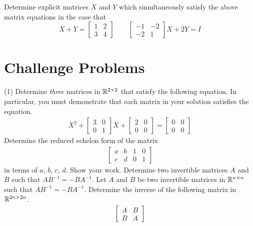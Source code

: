 \begin{tasks}[resume, style=enumerate]
\begin{enumerate}[label=(\alph*)]
    Determine explicit matrices $X$ and $Y$ which simultaneously
    satisfy the above matrix equations in the case that
    \begin{displaymath}
      X + Y = \begin{bmatrix} 1 & 2 \\ 3 & 4 \end{bmatrix}
      \qquad
      \begin{bmatrix} -1 & -2 \\ -2 & 1 \end{bmatrix} X + 2Y = I
    \end{displaymath}
  \end{enumerate}
\end{tasks}

\section{Challenge Problems}

\begin{tasks}[resume, style=enumerate](1)
\task
  Determine \textit{three} matrices in $\mathbb R^{2 \times 2}$ that satisfy
  the following equation.  In particular, you must demonstrate that
  each matrix in your solution satisfies the equation.
  \begin{align*}
    X^2 +
    \begin{bmatrix}
      3 & 0 \\
      0 & 1
    \end{bmatrix}
    X
    +
    \begin{bmatrix}
      2 & 0 \\
      0 & 0
    \end{bmatrix}
    =
    \begin{bmatrix}
      0 & 0 \\
      0 & 0
    \end{bmatrix}
  \end{align*}
\task
  Determine the reduced echelon form of the matrix
  \begin{align*}
    \begin{bmatrix}
      a & b & 1 & 0 \\
      c & d & 0 & 1
    \end{bmatrix}
  \end{align*}
  in terms of $a$, $b$, $c$, $d$. Show your work.
\task
  Determine two invertible matrices $A$ and $B$ such that $AB^{-1} =
  -BA^{-1}$.
\task
  Let $A$ and $B$ be two invertible matrices in $\mathbb R^{n \times n}$ such
  that $AB^{-1} = -BA^{-1}$.  Determine the inverse of the following
  matrix in $\mathbb R^{2n \times 2n}$.
  \begin{align*}
    \begin{bmatrix}
      A & B \\
      B & A
    \end{bmatrix}
  \end{align*}
\end{tasks}
